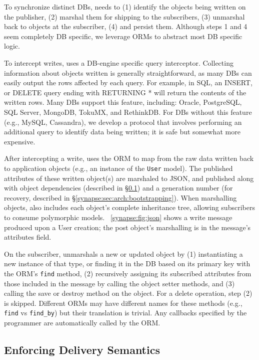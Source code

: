 To synchronize distinct DBs, \synapse needs to (1) identify the objects being
written on the publisher, (2) marshal them for shipping to the subscribers, (3)
unmarshal back to objects at the subscriber, (4) and persist them.
Although steps 1 and 4 seem completely DB specific, we leverage ORMs to abstract most DB specific logic.

To intercept writes, \synapse uses a DB-engine specific query interceptor.
Collecting information about objects written is
generally straightforward, as many DBs can easily output the rows affected
by each query. For example, in SQL, an {\code INSERT}, or {\code DELETE}
query ending with {\code RETURNING *} will return the contents of the
written rows. Many DBs support this feature, including: Oracle, PostgreSQL, SQL
Server, MongoDB, TokuMX, and RethinkDB. For DBs without this feature
(e.g., MySQL, Cassandra), we develop a protocol that involves performing an additional
query to identify data being written; it is safe but somewhat more expensive.


After intercepting a write, \synapse uses the ORM to map from the raw data
written back to application objects (e.g., an instance of the {\tt User} model).
The published attributes of these written object(s) are marshaled to JSON, and published
along with object dependencies (described in
\S\ref{synapse:sec:arch:cross-db-causality}) and a generation number (for recovery,
described in \S\ref{synapse:sec:arch:bootstrapping}). When marshalling objects,
\synapse also includes each object's complete inheritance tree, allowing
subscribers to consume polymorphic models.
\F~\ref{synapse:fig:json} shows a write message produced
upon a {\code User} creation; the post object's marshalling is in the message's
{\code attributes} field.

On the subscriber, \synapse unmarshals a new or updated object by (1)
instantiating a new instance of that type, or finding it in the DB based on its primary key with
the ORM's {\tt find} method, (2) recursively assigning its
subscribed attributes from those included in the message by calling the
object setter methods, and (3) calling the {\code save} or {\code
destroy} method on the object. For a delete operation, step (2) is skipped.
Different ORMs may have different names for these methods (e.g., {\tt find} vs
{\tt find\_by}) but their translation is trivial. Any callbacks specified by the
programmer are automatically called by the ORM.

\subsection{Enforcing Delivery Semantics} \label{synapse:sec:arch:cross-db-causality}

